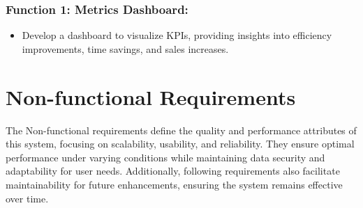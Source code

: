 \subsubsection*{Function 1: Metrics Dashboard:
}

\begin{itemize}
    \item Develop a dashboard to visualize KPIs, providing insights into efficiency improvements, time savings, and sales increases.
\end{itemize}





\section{Non-functional Requirements}


The Non-functional requirements define the quality and performance attributes of this system, focusing on scalability, usability, and reliability. They ensure optimal performance under varying conditions while maintaining data security and adaptability for user needs. Additionally, following requirements also facilitate maintainability for future enhancements, ensuring the system remains effective over time.



